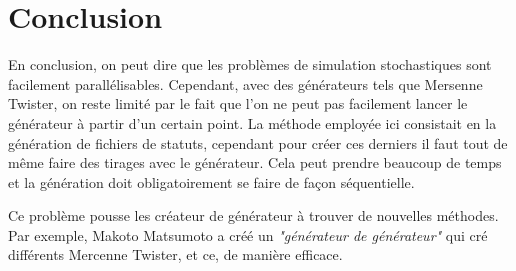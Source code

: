 \documentclass[a4paper]{article}
\begin{document}
\clearpage
\section{Conclusion}

En conclusion, on peut dire que les problèmes de simulation stochastiques sont
facilement parallélisables. Cependant, avec des générateurs tels que Mersenne
Twister, on reste limité par le fait que l'on ne peut pas facilement lancer le
générateur à partir d'un certain point. La méthode employée ici consistait en la
génération de fichiers de statuts, cependant pour créer ces derniers il faut
tout de même faire des tirages avec le générateur. Cela peut prendre beaucoup de
temps et la génération doit obligatoirement se faire de façon séquentielle.

Ce problème pousse les créateur de générateur à trouver de nouvelles méthodes.
Par exemple, Makoto Matsumoto a créé un \textit{"générateur de générateur"} qui
cré différents Mercenne Twister, et ce, de manière efficace.
\end{document}
